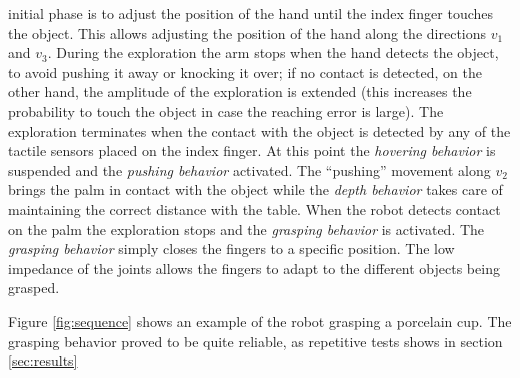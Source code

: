 initial phase is to adjust the position of the hand until the
index finger touches the object. This allows adjusting the
position of the hand along the directions $v_1$ and $v_3$. During
the exploration the arm stops when the hand detects the object, to
avoid pushing it away or knocking it over; if no contact is
detected, on the other hand, the amplitude of the exploration is
extended (this increases the probability to touch the object in
case the reaching error is large). The exploration terminates when
the contact with the object is detected by any of the tactile
sensors placed on the index finger. At this point the \emph{hovering
behavior} is suspended and the \emph{pushing behavior} activated. The
``pushing'' movement along $v_2$ brings the palm in contact with
the object while the \emph{depth behavior} takes care of
maintaining the correct distance with the table. When the robot
detects contact on the palm the exploration stops and the
\emph{grasping behavior} is activated. The \emph{grasping
behavior} simply closes the fingers to a specific position. The
low impedance of the joints allows the fingers to adapt to the
different objects being grasped.

Figure \ref{fig:sequence} shows an example of the robot grasping 
a porcelain cup. The grasping behavior proved to be quite reliable, as 
repetitive tests shows in section \ref{sec:results}